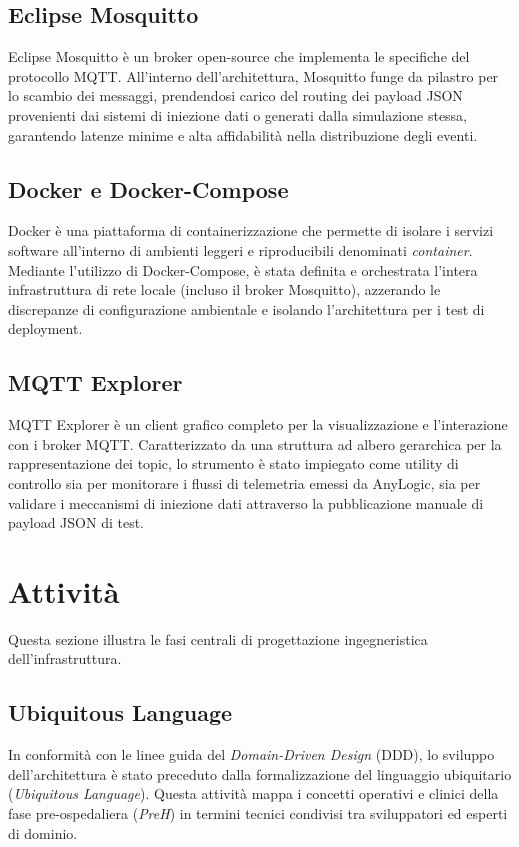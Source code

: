 \documentclass[12pt,a4paper,oneside]{article}
\begin{document}
\subsection{Eclipse Mosquitto}
Eclipse Mosquitto è un broker open-source che implementa le specifiche
del protocollo MQTT. All'interno dell'architettura, Mosquitto funge
da pilastro per lo scambio dei messaggi, prendendosi carico del routing
dei payload JSON provenienti dai sistemi di iniezione dati o generati 
dalla simulazione stessa, garantendo latenze minime e alta affidabilità 
nella distribuzione degli eventi.

\subsection{Docker e Docker-Compose}
Docker è una piattaforma di containerizzazione che permette di isolare i 
servizi software all'interno di ambienti leggeri e riproducibili denominati 
\textit{container}. Mediante l'utilizzo di Docker-Compose, è stata definita 
e orchestrata l'intera infrastruttura di rete locale (incluso il broker Mosquitto),
 azzerando le discrepanze di configurazione ambientale e isolando l'architettura 
 per i test di deployment.

\subsection{MQTT Explorer}
MQTT Explorer è un client grafico completo per la visualizzazione e l'interazione 
con i broker MQTT. Caratterizzato da una struttura ad albero gerarchica per la 
rappresentazione dei topic, lo strumento è stato impiegato come utility di 
controllo sia per monitorare i flussi di telemetria emessi da AnyLogic, sia 
per validare i meccanismi di iniezione dati attraverso la pubblicazione manuale 
di payload JSON di test.

\section{Attività}
Questa sezione illustra le fasi centrali di progettazione ingegneristica dell'infrastruttura.

\subsection{Ubiquitous Language}
In conformità con le linee guida del \textit{Domain-Driven Design} (DDD),
lo sviluppo dell'architettura è stato preceduto dalla formalizzazione
del linguaggio ubiquitario (\textit{Ubiquitous Language}).
Questa attività mappa i concetti operativi e clinici della fase pre-ospedaliera
(\textit{PreH}) in termini tecnici condivisi tra sviluppatori ed
esperti di dominio.
\end{document}
